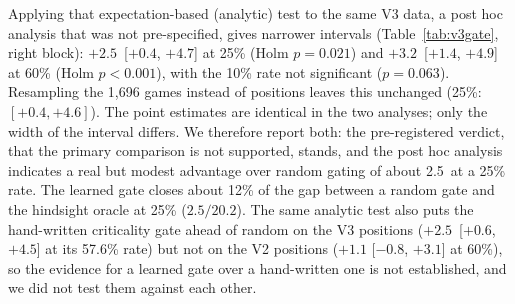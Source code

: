 Applying that expectation-based (analytic) test to the same V3 data, a post hoc analysis that was not pre-specified, gives narrower intervals (Table~\ref{tab:v3gate}, right block): $+2.5$\cp\ [$+0.4$, $+4.7$] at 25\% (Holm $p=0.021$) and $+3.2$\cp\ [$+1.4$, $+4.9$] at 60\% (Holm $p<0.001$), with the 10\% rate not significant ($p=0.063$). Resampling the 1{,}696 games instead of positions leaves this unchanged (25\%: $[+0.4,+4.6]$). The point estimates are identical in the two analyses; only the width of the interval differs. We therefore report both: the pre-registered verdict, that the primary comparison is not supported, stands, and the post hoc analysis indicates a real but modest advantage over random gating of about 2.5\cp\ at a 25\% rate. The learned gate closes about 12\% of the gap between a random gate and the hindsight oracle at 25\% ($2.5/20.2$\cp). The same analytic test also puts the hand-written criticality gate ahead of random on the V3 positions ($+2.5$\cp\ [$+0.6$, $+4.5$] at its 57.6\% rate) but not on the V2 positions ($+1.1$ [$-0.8$, $+3.1$] at 60\%), so the evidence for a learned gate over a hand-written one is not established, and we did not test them against each other.

\begin{table}[t]
\centering
\caption{V3 test, composed ACPL on 2{,}000 positions of 2025-02, recomputed from the per-position files. Advantage is random minus learned (cp; $>0$ favours the learned gate); $p$ is one-sided; Holm over the three rates. Pre-registered test: a fresh random gate per resample (reproduces the project's logged output). Analytic test (post hoc): expectation over random gates, 4{,}000 position resamples. Reference ACPL: never search 76.6, critical gate (57.6\%) 67.4, always search 64.9. $^{*}$Primary comparison. $^{\S}$Hindsight oracle, not achievable.}
\label{tab:v3gate}

\end{table}

